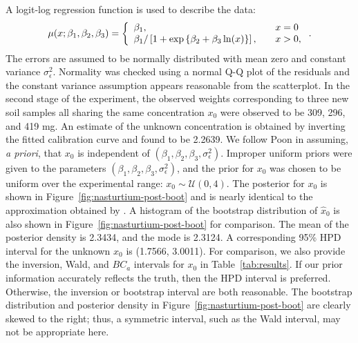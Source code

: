 \documentclass[cmfont,usenames,dvipsnames,leqno]{afit-etd}\usepackage[]{graphicx}\usepackage[]{color}
\newcommand{\mc}[1]{\ensuremath{\mathcal{#1}}}
\newcommand{\wh}[1]{\ensuremath{\widehat{#1}}}
\begin{document}
A logit-log regression function is used to describe the data:
\begin{equation*}
  \mu(x; \beta_1, \beta_2, \beta_3) = \left\{ \begin{array}{l l}
                                              \beta_1, &\quad x = 0 \\
                                              \beta_1 / \left[1 + \exp\left\{\beta_2 + \beta_3\ln(x)\right\}\right], &\quad x > 0,
                                            \end{array} \right..
\end{equation*}
The errors are assumed to be normally distributed with mean zero and constant variance $\sigma_\epsilon^2$. Normality was checked using a normal Q-Q plot of the residuals and the constant variance assumption appears reasonable from the scatterplot. In the second stage of the experiment, the observed weights corresponding to three new soil samples all sharing the same concentration $x_0$ were observed to be 309, 296, and 419 mg. An estimate of the unknown concentration is obtained by inverting the fitted calibration curve and found to be 2.2639. We follow Poon in assuming, \textit{a priori}, that $x_0$ is independent of $(\beta_1, \beta_2, \beta_3, \sigma_\epsilon^2)$. Improper uniform priors were given to the parameters $(\beta_1, \beta_2, \beta_3, \sigma_\epsilon^2)$, and the prior for $x_0$ was chosen to be uniform over the experimental range: $x_0 \sim \mc{U}(0, 4)$. The posterior for $x_0$ is shown in Figure~\ref{fig:nasturtium-post-boot} and is nearly identical to the approximation obtained by \citet[fig. 9]{racine-poon_bayesian_1988}. A histogram of the bootstrap distribution of $\wh{x}_0$ is also shown in Figure~\ref{fig:nasturtium-post-boot} for comparison. The mean of the posterior density is 2.3434, and the mode is 2.3124. A corresponding 95\% HPD interval for the unknown $x_0$ is (1.7566, 3.0011). For comparison, we also provide the inversion, Wald, and $BC_a$ intervals for $x_0$ in Table~\ref{tab:results}. If our prior information accurately reflects the truth, then the HPD interval is preferred. Otherwise, the inversion or bootstrap interval are both reasonable. The bootstrap distribution and posterior density in Figure~\ref{fig:nasturtium-post-boot} are clearly skewed to the right; thus, a symmetric interval, such as the Wald interval, may not be appropriate here.
\end{document}
